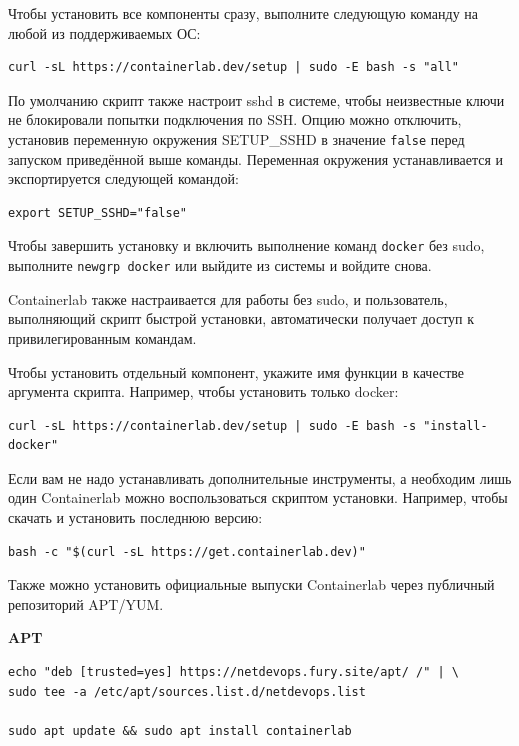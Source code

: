 \documentclass[
  english,
  russian,
  12pt,
  a4paper,
]{phdthesr}
\begin{document}
Чтобы установить все компоненты сразу, выполните следующую команду на
любой из поддерживаемых ОС:

\begin{verbatim}
curl -sL https://containerlab.dev/setup | sudo -E bash -s "all"
\end{verbatim}

По умолчанию скрипт также настроит sshd в системе, чтобы неизвестные
ключи не блокировали попытки подключения по SSH. Опцию можно отключить,
установив переменную окружения SETUP\_SSHD в значение \texttt{false}
перед запуском приведённой выше команды. Переменная окружения
устанавливается и экспортируется следующей командой:

\begin{verbatim}
export SETUP_SSHD="false"
\end{verbatim}

Чтобы завершить установку и включить выполнение команд \texttt{docker}
без sudo, выполните \texttt{newgrp\ docker} или выйдите из системы и
войдите снова.

Containerlab также настраивается для работы без sudo, и пользователь,
выполняющий скрипт быстрой установки, автоматически получает доступ к
привилегированным командам.

Чтобы установить отдельный компонент, укажите имя функции в качестве
аргумента скрипта. Например, чтобы установить только docker:

\begin{verbatim}
curl -sL https://containerlab.dev/setup | sudo -E bash -s "install-docker"
\end{verbatim}

Если вам не надо устанавливать дополнительные инструменты, а необходим
лишь один Containerlab можно воспользоваться скриптом установки.
Например, чтобы скачать и установить последнюю версию:

\begin{verbatim}
bash -c "$(curl -sL https://get.containerlab.dev)"
\end{verbatim}

Также можно установить официальные выпуски Containerlab через публичный
репозиторий APT/YUM.

\textbf{APT}

\begin{verbatim}
echo "deb [trusted=yes] https://netdevops.fury.site/apt/ /" | \
sudo tee -a /etc/apt/sources.list.d/netdevops.list

sudo apt update && sudo apt install containerlab
\end{verbatim}
\end{document}
